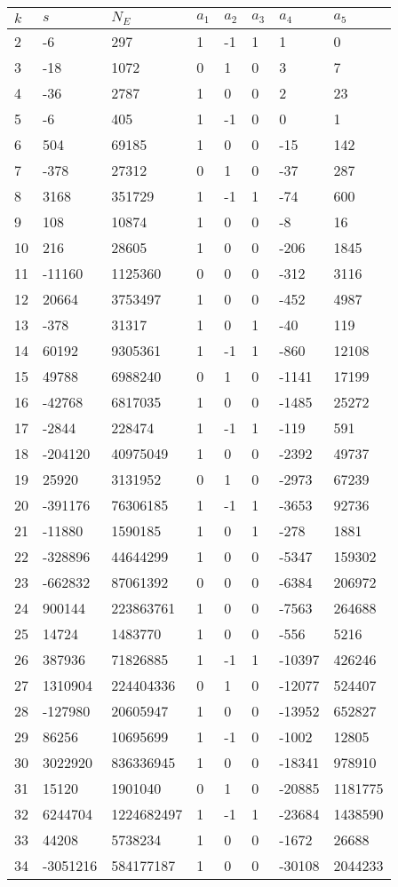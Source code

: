 \documentclass{amsart}
\begin{document}
\begin{longtable}{|l|l|l|lllll|}
\hline
$k$ & $s$ & $N_E$ & $a_1$ & $a_2$ & $a_3$ & $a_4$ & $a_5$\\
\hline
2&-6&297&1&-1&1&1&0\\
3&-18&1072&0&1&0&3&7\\
4&-36&2787&1&0&0&2&23\\
5&-6&405&1&-1&0&0&1\\
6&504&69185&1&0&0&-15&142\\
7&-378&27312&0&1&0&-37&287\\
8&3168&351729&1&-1&1&-74&600\\
9&108&10874&1&0&0&-8&16\\
10&216&28605&1&0&0&-206&1845\\
11&-11160&1125360&0&0&0&-312&3116\\
12&20664&3753497&1&0&0&-452&4987\\
13&-378&31317&1&0&1&-40&119\\
14&60192&9305361&1&-1&1&-860&12108\\
15&49788&6988240&0&1&0&-1141&17199\\
16&-42768&6817035&1&0&0&-1485&25272\\
17&-2844&228474&1&-1&1&-119&591\\
18&-204120&40975049&1&0&0&-2392&49737\\
19&25920&3131952&0&1&0&-2973&67239\\
20&-391176&76306185&1&-1&1&-3653&92736\\
21&-11880&1590185&1&0&1&-278&1881\\
22&-328896&44644299&1&0&0&-5347&159302\\
23&-662832&87061392&0&0&0&-6384&206972\\
24&900144&223863761&1&0&0&-7563&264688\\
25&14724&1483770&1&0&0&-556&5216\\
26&387936&71826885&1&-1&1&-10397&426246\\
27&1310904&224404336&0&1&0&-12077&524407\\
28&-127980&20605947&1&0&0&-13952&652827\\
29&86256&10695699&1&-1&0&-1002&12805\\
30&3022920&836336945&1&0&0&-18341&978910\\
31&15120&1901040&0&1&0&-20885&1181775\\
32&6244704&1224682497&1&-1&1&-23684&1438590\\
33&44208&5738234&1&0&0&-1672&26688\\
34&-3051216&584177187&1&0&0&-30108&2044233\\

\end{longtable}
\end{document}
